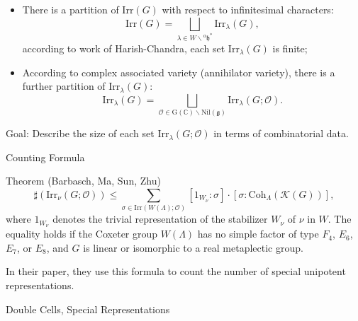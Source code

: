 \documentclass{beamer}
\newcommand{\BC}{{\mathbb {C}}}
\newcommand{\CK}{{\mathcal {K}}}
\newcommand{\CO}{{\mathcal {O}}}
\newcommand{\RG}{{\mathrm {G}}}
\newcommand{\fg}{\mathfrak{g}}
\newcommand{\fh}{\mathfrak{h}}
\newcommand{\Irr}{{\mathrm{Irr}}}
\newcommand{\Nil}{{\mathrm{Nil}}}
\begin{document}
\begin{frame}

  \begin{itemize}
    \item There is a partition of $\Irr(G)$ with respect to infinitesimal characters:
  \[\Irr(G) = \bigsqcup_{\lambda \in W \backslash {^{a}\fh}^*} \Irr_{\lambda}(G),
  \]
  according to work of Harish-Chandra, each set $\Irr_{\lambda}(G)$ is finite;
  \item According to complex associated variety (annihilator variety), there is a further partition of $\Irr_{\lambda}(G)$:
  \[\Irr_{\lambda}(G) = \bigsqcup_{\CO \in \RG(\BC)\backslash \Nil(\fg)}\Irr_{\lambda}(G;\CO).\]
  \end{itemize}

Goal: Describe the size of each set $\Irr_{\lambda}(G;\CO)$ in terms of combinatorial data.
\end{frame}






\begin{frame}{Counting Formula}
\begin{block}{Theorem (Barbasch, Ma, Sun, Zhu)}
  \begin{equation*}
        \sharp(\Irr_{\nu}(G;\CO)) \leq \sum_{\sigma \in \Irr(W(\Lambda);\CO)} [1_{W_\nu}:\sigma] \cdot [\sigma:\mathrm{Coh}_{\Lambda}(\CK(G))],
    \end{equation*}
    where $1_{W_\nu}$ denotes the trivial representation of the stabilizer $W_\nu$ of $\nu$ in $W$. The equality holds if the Coxeter group $W(\Lambda)$ has no simple factor of type $F_4$, $E_6$, $E_7$, or $E_8$, and $G$ is linear or isomorphic to a real metaplectic group.
\end{block}

In their paper, they use this formula to count the number of special unipotent representations.

\end{frame}





\begin{frame}{Double Cells, Special Representations}
  
\end{frame}
\end{document}
